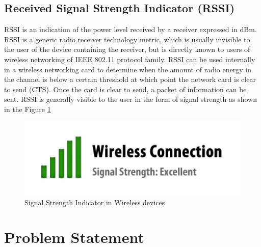 \documentclass[11pt,a4paper,headinclude,footinclude,chapterprefix=on]{scrreprt}
\begin{document}
\section{Received Signal Strength Indicator (RSSI)} RSSI is an indication of the power level received by a receiver expressed in dBm. RSSI is a generic radio receiver technology metric, which is usually invisible to the user of the device containing the receiver, but is directly known to users of wireless networking of IEEE 802.11 protocol family. RSSI can be used internally in a wireless networking card to determine when the amount of radio energy in the channel is below a certain threshold at which point the network card is clear to send (CTS). Once the card is clear to send, a packet of information can be sent. RSSI is generally visible to the user in the form of signal strength as shown in the Figure \ref{fig:rssi} 
\begin{figure}
	[!h] \centering 
	\includegraphics[width=13cm]{Images/rssi.png} \caption{Signal Strength Indicator in Wireless devices } \label{fig:rssi} 
\end{figure}

\chapter{Problem Statement} 
\end{document}
